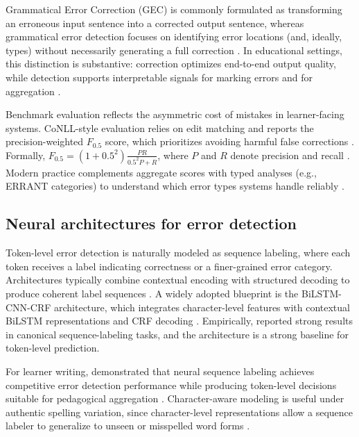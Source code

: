 Grammatical Error Correction (GEC) is commonly formulated as transforming an erroneous input sentence into a corrected output sentence, whereas grammatical error detection focuses on identifying error locations (and, ideally, types) without necessarily generating a full correction \parencite{Ng2014,ReiYannakoudakis2016}. In educational settings, this distinction is substantive: correction optimizes end-to-end output quality, while detection supports interpretable signals for marking errors and for aggregation \parencite{BryantFeliceBriscoe2017,Bryant2023GECsurvey}.

Benchmark evaluation reflects the asymmetric cost of mistakes in learner-facing systems. CoNLL-style evaluation relies on edit matching and reports the precision-weighted \(F_{0.5}\) score, which prioritizes avoiding harmful false corrections \parencite{DahlmeierNg2012,Ng2014}. Formally, \(F_{0.5} = (1+0.5^2)\frac{PR}{0.5^2P+R}\), where \(P\) and \(R\) denote precision and recall \parencite{DahlmeierNg2012}. Modern practice complements aggregate scores with typed analyses (e.g., ERRANT categories) to understand which error types systems handle reliably \parencite{Bryant2019,BryantFeliceBriscoe2017}.

\subsection{Neural architectures for error detection}
\label{sec:sota_gec_arch}

Token-level error detection is naturally modeled as sequence labeling, where each token receives a label indicating correctness or a finer-grained error category. Architectures typically combine contextual encoding with structured decoding to produce coherent label sequences \parencite{HochreiterSchmidhuber1997,HuangXuYu2015}. A widely adopted blueprint is the BiLSTM-CNN-CRF architecture, which integrates character-level features with contextual BiLSTM representations and CRF decoding \parencite{MaHovy2016}. Empirically, \textcite{MaHovy2016} reported strong results in canonical sequence-labeling tasks, and the architecture is a strong baseline for token-level prediction.

For learner writing, \textcite{ReiYannakoudakis2016} demonstrated that neural sequence labeling achieves competitive error detection performance while producing token-level decisions suitable for pedagogical aggregation \parencite{ReiYannakoudakis2016,BryantFeliceBriscoe2017}. Character-aware modeling is useful under authentic spelling variation, since character-level representations allow a sequence labeler to generalize to unseen or misspelled word forms \parencite{MaHovy2016}.

